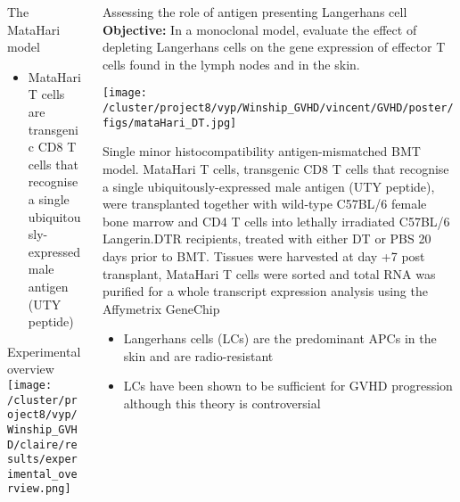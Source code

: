 \documentclass[final,hyperref={pdfpagelabels=false}]{beamer}
\begin{document}
\begin{frame}{}
\begin{columns}[t]
\begin{column}{.26\linewidth}
\begin{block}{The MataHari model}  %
{\small	\begin{itemize}
\item MataHari T cells are transgenic CD8 T cells that recognise a single ubiquitously-expressed male antigen (UTY peptide)
\end{itemize}}
\end{block}

\begin{block}{Experimental overview}
  \texttt{[image: /cluster/project8/vyp/Winship\_GVHD/claire/results/experimental\_overview.png]}
\end{block}
  \end{column}



  \begin{column}{.36\linewidth}
    \begin{block}{Assessing the role of antigen presenting Langerhans cell}
  {\bf Objective:} In a monoclonal model, evaluate the effect of depleting Langerhans cells on the gene expression of effector T cells found in the lymph nodes and in the skin.


  \begin{minipage}{20cm}
   \texttt{[image: /cluster/project8/vyp/Winship\_GVHD/vincent/GVHD/poster/figs/mataHari\_DT.jpg]}
        \end{minipage}
  \begin{minipage}{20cm}
    {\tiny Single minor histocompatibility antigen-mismatched BMT model. MataHari T cells, transgenic CD8 T cells that recognise a single ubiquitously-expressed male antigen (UTY peptide), were transplanted together with wild-type C57BL/6 female bone marrow and CD4 T cells into lethally irradiated C57BL/6 Langerin.DTR recipients, treated with either DT or PBS 20 days prior to BMT. Tissues were harvested at day +7 post transplant, MataHari T cells were sorted and total RNA was purified for a whole transcript expression analysis using the Affymetrix GeneChip}
        \end{minipage}



{\small	\begin{itemize} %
\item Langerhans cells (LCs) are the predominant APCs in the skin and are radio-resistant  
\item LCs have been shown to be sufficient for GVHD progression although this theory is controversial  
\end{itemize}}


\end{block}
\end{column}
\end{columns}
\end{frame}
\end{document}

